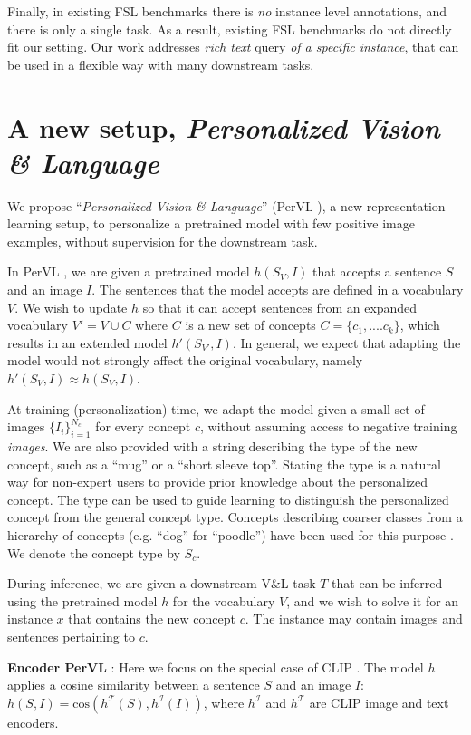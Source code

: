 \documentclass[runningheads]{llncs}
\newcommand\edit[1]{#1}
\newcommand{\cossim}[2]{\text{cos}(#1, #2)}
\newcommand{\VL}{V\&L {}}
\newcommand{\CLIPI}{h^{\mathcal{I}}}
\newcommand{\CLIPT}{h^{\mathcal{T}}}
\newcommand{\PerVL}{PerVL {}}
\newcommand{\img}{I}
\begin{document}
\edit{Finally, in existing FSL benchmarks \cite{vinyals2016matching,ren2018metalearning,zhang2021personalized} there is \textit{no} instance level annotations, and there is only a single task. As a result, existing FSL benchmarks do not directly fit our setting. Our work addresses \textit{rich text} query \textit{of a specific instance}, that can be used in a flexible way with many downstream tasks. 
 }

\section{A new setup, \textit{Personalized Vision \& Language}}
We propose ``\textit{Personalized Vision \& Language}'' (\PerVL\!\!), a new representation learning setup, to personalize a pretrained model with few positive image examples, without supervision for the downstream task. 


In \PerVL, we are given a pretrained model $h(S_V, \img)$ that accepts a sentence $S$ and an image $\img$. The sentences that the model accepts are defined in a vocabulary $V$. We wish to update $h$ so that it can accept sentences from an expanded vocabulary $V' = V \cup C $ where $C$ is a new set of concepts $C = \{c_1,....c_k\}$, which results in an extended model $h'(S_{V'},I)$.
In general, we expect that adapting the model would not strongly affect the original vocabulary, namely $h'(S_V,I) \approx h(S_V,I)$. 


At training (personalization) time, we adapt the model given a small set of images $\{\img_i\}_{i=1}^{N_c}$ for every concept $c$, without assuming access to negative training \textit{images}. We are also provided with a string describing the type of the new concept, such as a ``mug'' or a ``short sleeve top''.
Stating the type is a natural way for non-expert users to provide prior knowledge about the personalized concept. The type can be used to guide learning to distinguish the personalized concept from the general concept type.
Concepts describing coarser classes from a hierarchy of concepts (e.g. ``dog'' for ``poodle'') have been used for this purpose \cite{dekel2004large}.
We denote the concept type by $S_c$.


During inference, we are given a downstream \VL task $T$ that can be inferred using the pretrained model $h$ for the vocabulary $V$, and we wish to solve it for an instance $x$ that contains the new concept $c$. The instance may contain images and sentences pertaining to $c$.

\textbf{Encoder \PerVL}:
Here we focus on the special case of CLIP \cite{radford2021learning}. The model $h$ applies a cosine similarity between a sentence $S$ and an image $\img$: $h(S, \img) = \cossim{\CLIPT(S)}{ \CLIPI(\img)}$, where $\CLIPI$ and $\CLIPT$ are CLIP image and text encoders.
\end{document}
